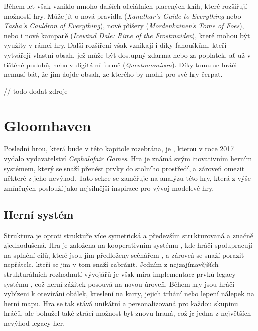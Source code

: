 Během let však vzniklo mnoho dalších oficiálních placených knih, které rozšiřují možnosti hry. Může jít o nová pravidla (\textit{Xanathar's Guide to Everything} nebo \textit{Tasha's Cauldron of Everything}), nové příšery (\textit{Mordenkainen's Tome of Foes}), nebo i nové kampaně (\textit{Icewind Dale: Rime of the Frostmaiden}), které mohou být využity v rámci hry. Další rozšíření však vznikají i díky fanouškům, kteří vytvářejí vlastní obsah, jež může být dostupný zdarma nebo za poplatek, ať už v tištěné podobě, nebo v digitální formě (\textit{Questonomicon}). Díky tomu se hráči nemusí bát, že jim dojde obsah, ze kterého by mohli pro své hry čerpat.

// todo dodat zdroje



\section{Gloomhaven}
\label{sec:gloomhaven}

Poslední hrou, která bude v této kapitole rozebrána, je , kterou v roce 2017 vydalo vydavatelství \textit{Cephalofair Games}. Hra je známá svým inovativním herním systémem, který se snaží přenést prvky \dnd{} do stolního prostředí, a zároveň omezit některé z jeho nevýhod. Tato sekce se zaměřuje na analýzu této hry, která z výše zmíněných poslouží jako nejsilnější inspirace pro vývoj modelové hry.

\subsection{Herní systém}
\label{subsec:gh_gameplay}

Struktura  je oproti struktuře \dnd{} více symetrická a především strukturovaná a značně zjednodušená. Hra je založena na kooperativním systému , kde hráči spolupracují na splnění cílů, které jsou jim předloženy scénářem , a zároveň se snaží porazit nepřátele, kteří se jim v tom snaží zabránit. Jedním z nejzajímavějších strukturálních rozhodnutí vývojářů je však míra implementace prvků legacy systému , což herní zážitek posouvá na novou úroveň. Během hry jsou hráči vybízeni k otevírání obálek, kreslení na karty, jejich trhání nebo lepení nálepek na herní mapu. Hra se tak stává unikátní a personalizovaná pro každou skupinu hráčů, ale bohužel také ztrácí možnost být znovu hraná, což je jedna z největších nevýhod legacy her.

